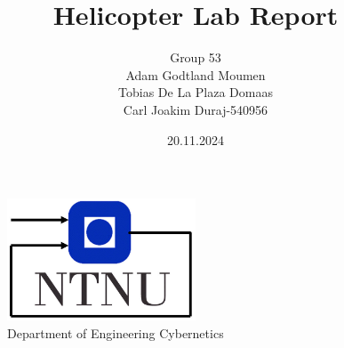 \documentclass[11pt, a4paper, USenglish]{article} %
\begin{document}
\title{Helicopter Lab Report }
\author{Group 53\\Adam Godtland Moumen\\Tobias De La Plaza Domaas\\Carl Joakim Duraj-540956}
\date{20.11.2024}
\begin{titlepage}
    \maketitle
    \begin{figure}
    \centering
    \includegraphics[width=0.5\textwidth]{figures/itk_ntnu}\\
    Department of Engineering Cybernetics
    \end{figure}
    \thispagestyle{empty}
\end{titlepage}

\newpage
    
\thispagestyle{empty} %

\newpage
\tableofcontents
\thispagestyle{empty} %

\newpage
\setcounter{page}{1}






\newpage
{}
\printbibliography{}
\label{sec:bibliography}
\end{document}
